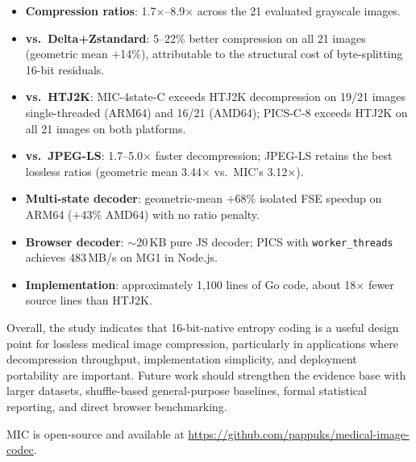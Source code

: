 \documentclass[journal]{IEEEtran}
\begin{document}
\begin{itemize}
  \item \textbf{Compression ratios}: 1.7$\times$--8.9$\times$ across the 21
  evaluated grayscale images.

  \item \textbf{vs.\ Delta+Zstandard}: 5--22\% better compression on all 21
  images (geometric mean $+$14\%), attributable to the structural cost of
  byte-splitting 16-bit residuals.

  \item \textbf{vs.\ HTJ2K}: MIC-4state-C exceeds HTJ2K decompression on 19/21
  images single-threaded (ARM64) and 16/21 (AMD64); PICS-C-8 exceeds HTJ2K on
  all 21 images on both platforms.

  \item \textbf{vs.\ JPEG-LS}: 1.7--5.0$\times$ faster decompression; JPEG-LS
  retains the best lossless ratios (geometric mean 3.44$\times$ vs.\ MIC's
  3.12$\times$).

  \item \textbf{Multi-state decoder}: geometric-mean $+$68\% isolated FSE
  speedup on ARM64 ($+$43\% AMD64) with no ratio penalty.

  \item \textbf{Browser decoder}: ${\sim}$20\,KB pure JS decoder; PICS with
  \texttt{worker\_threads} achieves 483\,MB/s on MG1 in Node.js.

  \item \textbf{Implementation}: approximately 1,100 lines of Go code, about
  18$\times$ fewer source lines than HTJ2K.
\end{itemize}

Overall, the study indicates that 16-bit-native entropy coding is a useful
design point for lossless medical image compression, particularly in
applications where decompression throughput, implementation simplicity, and
deployment portability are important. Future work should strengthen the evidence
base with larger datasets, shuffle-based general-purpose baselines, formal
statistical reporting, and direct browser benchmarking.

MIC is open-source and available at
\url{https://github.com/pappuks/medical-image-codec}.

\end{document}
